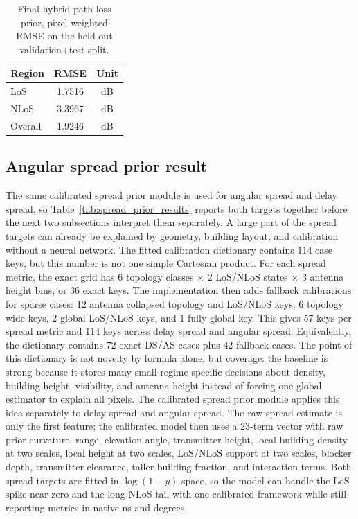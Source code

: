 \begin{table}[!htbp]
\centering
\caption{Final hybrid path loss prior, pixel weighted RMSE on the
held out validation+test split.}
\label{tab:pl_prior_results}
\begin{tabular}{lcc}
\toprule
Region & RMSE & Unit \\
\midrule
LoS & 1.7516 & dB \\
NLoS & 3.3967 & dB \\
Overall & 1.9246 & dB \\
\bottomrule
\end{tabular}
\end{table}

\subsection{Angular spread prior result}

The same calibrated spread prior module is used for angular spread and delay
spread, so Table~\ref{tab:spread_prior_results} reports both targets together
before the next two subsections interpret them separately. A large part of the
spread targets can already be explained by geometry, building layout, and
calibration without a neural network. The fitted calibration dictionary contains
\(114\) case keys, but this number is not one simple Cartesian product. For each
spread metric, the exact grid has
\(6\) topology classes \(\times\) \(2\) LoS/NLoS states \(\times\) \(3\)
antenna height bins, or \(36\) exact keys. The implementation then adds
fallback calibrations for sparse cases: \(12\) antenna collapsed topology
and LoS/NLoS keys, \(6\) topology wide keys, \(2\) global LoS/NLoS keys, and
\(1\) fully global key. This gives \(57\) keys per spread metric and
\(114\) keys across delay spread and angular spread. Equivalently, the
dictionary contains \(72\) exact DS/AS cases plus \(42\) fallback cases.
The point of this dictionary is not novelty by formula alone, but coverage: the
baseline is strong because it stores many small regime specific decisions about
density, building height, visibility, and antenna height instead of forcing one
global estimator to explain all pixels.
The calibrated spread prior module applies this idea separately to delay spread and angular spread. The
raw spread estimate is only the first feature; the calibrated model then uses a
23-term vector with raw prior curvature, range, elevation angle, transmitter height,
local building density at two scales, local height at two scales, LoS/NLoS
support at two scales, blocker depth, transmitter clearance, taller building
fraction, and interaction terms. Both spread targets are fitted in
\(\log(1+y)\) space, so the model can handle the LoS spike near zero and the
long NLoS tail with one calibrated framework while still reporting metrics in
native ns and degrees.

